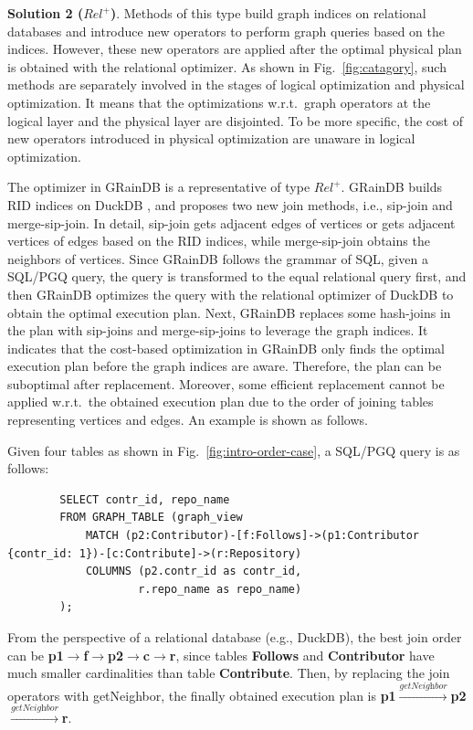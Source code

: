 {\textbf{Solution 2 ($Rel^+$)}.
Methods of this type build graph indices on relational databases and introduce new operators to perform graph queries based on the indices.
However, these new operators are applied after the optimal physical plan is obtained with the relational optimizer.
As shown in Fig.~\ref{fig:catagory}, such methods are separately involved in the stages of logical optimization and physical optimization.
It means that the optimizations w.r.t.~graph operators at the logical layer and the physical layer are disjointed.
To be more specific, the cost of new operators introduced in physical optimization are unaware in logical optimization.

The optimizer in GRainDB \cite{graindb} is a representative of type $Rel^+$.
GRainDB builds RID indices on DuckDB \cite{duckdb}, and proposes two new join methods, i.e., sip-join and merge-sip-join.
In detail, sip-join gets adjacent edges of vertices or gets adjacent vertices of edges based on the RID indices, while merge-sip-join obtains the neighbors of vertices.
Since GRainDB follows the grammar of SQL, given a SQL/PGQ query, the query is transformed to the equal relational query first, and then GRainDB optimizes the query with the relational optimizer of DuckDB to obtain the optimal execution plan.
Next, GRainDB replaces some hash-joins in the plan with sip-joins and merge-sip-joins to leverage the graph indices.
It indicates that the cost-based optimization in GRainDB only finds the optimal execution plan before the graph indices are aware.
Therefore, the plan can be suboptimal after replacement.
Moreover, some efficient replacement cannot be applied w.r.t.~the obtained execution plan due to the order of joining tables representing vertices and edges.
An example is shown as follows.

\begin{example}
    Given four tables as shown in Fig.~\ref{fig:intro-order-case}, a SQL/PGQ query is as follows:
    \begin{lstlisting}
        SELECT contr_id, repo_name
        FROM GRAPH_TABLE (graph_view
            MATCH (p2:Contributor)-[f:Follows]->(p1:Contributor {contr_id: 1})-[c:Contribute]->(r:Repository)
            COLUMNS (p2.contr_id as contr_id,
                    r.repo_name as repo_name)
        );
    \end{lstlisting}
    From the perspective of a relational database (e.g., DuckDB), the best join order can be \textbf{p1$\rightarrow$f$\rightarrow$p2$\rightarrow$c$\rightarrow$r}, since tables \textbf{Follows} and \textbf{Contributor} have much smaller cardinalities than table \textbf{Contribute}.
    Then, by replacing the join operators with getNeighbor, the finally obtained execution plan is \textbf{p1$\xrightarrow{\textit{getNeighbor}}$p2$\xrightarrow{\textit{getNeighbor}}$r}.


\end{example}}
